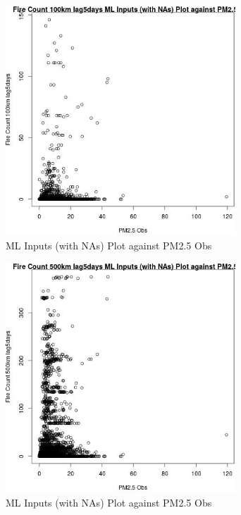 \begin{figure} 
\centering  
\includegraphics[width=0.77\textwidth]{Code_Outputs/Report_ML_input_PM25_Step4_part_e_de_duplicated_aves_compiled_2019-05-18wNAs_Fire_Count_100km_lag5daysvPM25_Obs.jpg} 
\caption{\label{fig:Report_ML_input_PM25_Step4_part_e_de_duplicated_aves_compiled_2019-05-18wNAsFire_Count_100km_lag5daysvPM25_Obs}ML Inputs (with NAs) Plot against PM2.5 Obs} 
\end{figure} 
 

\begin{figure} 
\centering  
\includegraphics[width=0.77\textwidth]{Code_Outputs/Report_ML_input_PM25_Step4_part_e_de_duplicated_aves_compiled_2019-05-18wNAs_Fire_Count_500km_lag5daysvPM25_Obs.jpg} 
\caption{\label{fig:Report_ML_input_PM25_Step4_part_e_de_duplicated_aves_compiled_2019-05-18wNAsFire_Count_500km_lag5daysvPM25_Obs}ML Inputs (with NAs) Plot against PM2.5 Obs} 
\end{figure} 
 

